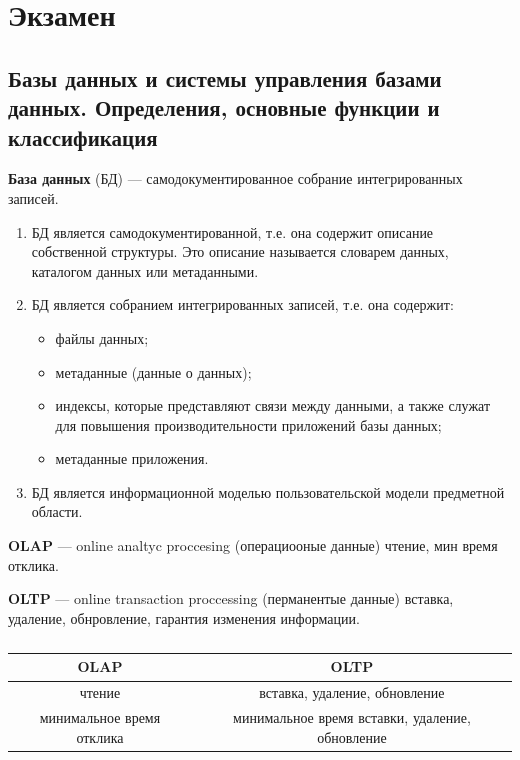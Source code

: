 \section{Экзамен}

\subsection{Базы данных и системы управления базами данных. Определения, основные функции и классификация}

\textbf{База данных} (БД) ---  самодокументированное собрание интегрированных записей.

\begin{enumerate}
	\item БД является самодокументированной, т.е. она содержит описание собственной структуры. Это описание называется словарем данных, каталогом данных или метаданными.
	\item БД является собранием интегрированных записей, т.е. она содержит:
	\begin{itemize}
		\item файлы данных;
		\item метаданные (данные о данных);
		\item индексы, которые представляют связи между данными, а также служат для повышения производительности приложений базы данных;
		\item метаданные приложения.
	\end{itemize}
	\item БД является информационной моделью пользовательской модели предметной области.
\end{enumerate}

\textbf{OLAP} --- online analtyc proccesing (операциооные данные) чтение, мин время отклика.

\textbf{OLTP} --- online transaction proccessing (перманентые данные) вставка, удаление, обнровление, гарантия изменения информации.

\begin{table}[ht!]
	\begin{center}
		\caption{}
		\label{tbl:best}
		\begin{tabular}{|c|c|}
			\hline
			OLAP & OLTP \\
			\hline
			чтение & вставка, удаление, обновление \\
			\hline
			минимальное время отклика & минимальное время вставки, удаление, обновление \\
			\hline
		\end{tabular}
	\end{center}
\end{table}

